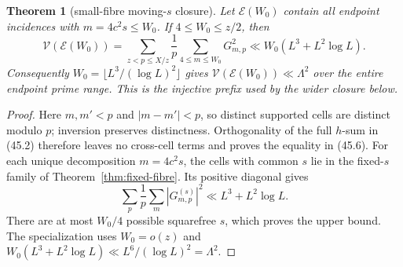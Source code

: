 \documentclass[10pt,reqno]{amsart}
\newtheorem{theorem}{Theorem}[section]
\theoremstyle{definition}
\newcommand{\1}{\mathbf 1}
\begin{document}
\begin{theorem}[small-fibre moving-$s$ closure]\label{thm:small-fibre}
Let $\mathcal E(W_0)$ contain all endpoint incidences with
$m=4c^2s\leq W_0$.  If $4\leq W_0\leq z/2$, then
\begin{equation}\tag{45.6}
 \mathcal V(\mathcal E(W_0))
 =\sum_{z<p\leq X/z}\frac1p\sum_{4\leq m\leq W_0}G_{m,p}^2
 \ll W_0(L^3+L^2\log L).
\end{equation}
Consequently $W_0=\lfloor L^3/(\log L)^2\rfloor$ gives
$\mathcal V(\mathcal E(W_0))\ll\Lambda^2$ over the entire endpoint prime
range.  This is the injective prefix used by the wider closure below.
\end{theorem}
\begin{proof}
Here $m,m'<p$ and $|m-m'|<p$, so distinct supported cells are distinct
modulo $p$; inversion preserves distinctness.  Orthogonality of the full
$h$-sum in (45.2) therefore leaves no cross-cell terms and proves the
equality in (45.6).  For each unique decomposition $m=4c^2s$, the cells
with common $s$ lie in the fixed-$s$ family of
Theorem~\ref{thm:fixed-fibre}.  Its positive diagonal gives
\[
 \sum_p\frac1p\sum_m|G^{(s)}_{m,p}|^2
 \ll L^3+L^2\log L.
\]
There are at most $W_0/4$ possible squarefree $s$, which proves the upper
bound.  The specialization uses $W_0=o(z)$ and
$W_0(L^3+L^2\log L)\ll L^6/(\log L)^2=\Lambda^2$.
\end{proof}
\end{document}

